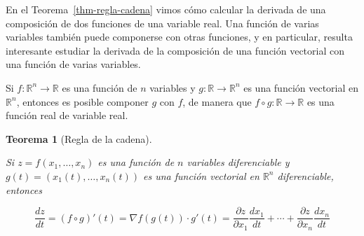 \documentclass[
  a4paper,
]{scrreport}
\theoremstyle{definition}
\theoremstyle{plain}
\newtheorem{theorem}{Teorema}[chapter]
\theoremstyle{plain}
\theoremstyle{definition}
\theoremstyle{definition}
\theoremstyle{plain}
\theoremstyle{remark}
\begin{document}
En el Teorema~\ref{thm-regla-cadena} vimos cómo calcular la derivada de
una composición de dos funciones de una variable real. Una función de
varias variables también puede componerse con otras funciones, y en
particular, resulta interesante estudiar la derivada de la composición
de una función vectorial con una función de varias variables.

Si \(f:\mathbb{R}^n\rightarrow \mathbb{R}\) es una función de \(n\)
variables y \(g:\mathbb{R}\rightarrow \mathbb{R}^n\) es una función
vectorial en \(\mathbb{R}^n\), entonces es posible componer \(g\) con
\(f\), de manera que \(f\circ g:\mathbb{R}\rightarrow \mathbb{R}\) es
una función real de variable real.

\begin{theorem}[Regla de la
cadena]\protect\hypertarget{thm-regla-cadena-funciones-varias-variables}{}\label{thm-regla-cadena-funciones-varias-variables}

Si \(z=f(x_1,\ldots,x_n)\) es una función de \(n\) variables
diferenciable y \(g(t)=(x_1(t),\ldots,x_n(t))\) es una función vectorial
en \(\mathbb{R}^n\) diferenciable, entonces

\[
\frac{dz}{dt} = (f\circ g)'(t) = \nabla f(g(t))\cdot g'(t) = \frac{\partial z}{\partial x_1}\frac{dx_1}{dt} + \cdots +\frac{\partial z}{\partial x_n}\frac{dx_n}{dt}
\]

\end{theorem}
\end{document}
